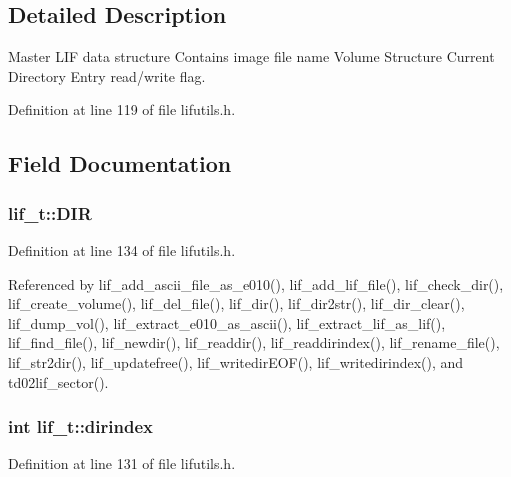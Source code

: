 \subsection{Detailed Description}
Master L\+IF data structure Contains image file name Volume Structure Current Directory Entry read/write flag. 

Definition at line 119 of file lifutils.\+h.



\subsection{Field Documentation}
\subsubsection[{\texorpdfstring{D\+IR}{DIR}}]{ lif\+\_\+t\+::\+D\+IR}\hypertarget{structlif__t_aefeaa526c04a2b8715b0392feeec52a3}{}\label{structlif__t_aefeaa526c04a2b8715b0392feeec52a3}


Definition at line 134 of file lifutils.\+h.



Referenced by lif\+\_\+add\+\_\+ascii\+\_\+file\+\_\+as\+\_\+e010(), lif\+\_\+add\+\_\+lif\+\_\+file(), lif\+\_\+check\+\_\+dir(), lif\+\_\+create\+\_\+volume(), lif\+\_\+del\+\_\+file(), lif\+\_\+dir(), lif\+\_\+dir2str(), lif\+\_\+dir\+\_\+clear(), lif\+\_\+dump\+\_\+vol(), lif\+\_\+extract\+\_\+e010\+\_\+as\+\_\+ascii(), lif\+\_\+extract\+\_\+lif\+\_\+as\+\_\+lif(), lif\+\_\+find\+\_\+file(), lif\+\_\+newdir(), lif\+\_\+readdir(), lif\+\_\+readdirindex(), lif\+\_\+rename\+\_\+file(), lif\+\_\+str2dir(), lif\+\_\+updatefree(), lif\+\_\+writedir\+E\+O\+F(), lif\+\_\+writedirindex(), and td02lif\+\_\+sector().

\subsubsection[{\texorpdfstring{dirindex}{dirindex}}]{\setlength{\rightskip}{0pt plus 5cm}int lif\+\_\+t\+::dirindex}\hypertarget{structlif__t_a74f8af3dc203c3c6b9dea3829bb4b6fa}{}\label{structlif__t_a74f8af3dc203c3c6b9dea3829bb4b6fa}


Definition at line 131 of file lifutils.\+h.



